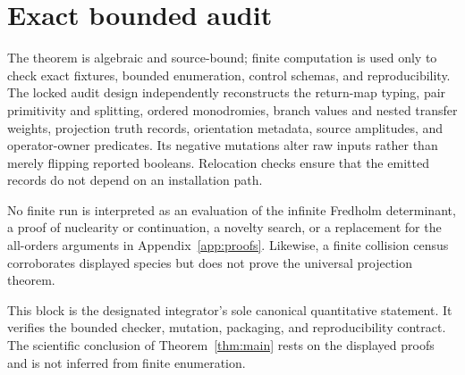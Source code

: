 \section{Exact bounded audit}
\label{sec:audit}

The theorem is algebraic and source-bound; finite computation is used only to
check exact fixtures, bounded enumeration, control schemas, and
reproducibility.  The locked audit design independently reconstructs the
return-map typing, pair primitivity and splitting, ordered monodromies,
branch values and nested transfer weights, projection truth records,
orientation metadata, source amplitudes, and operator-owner predicates.  Its
negative mutations alter raw inputs rather than merely flipping reported
booleans.  Relocation checks ensure that the emitted records do not depend on
an installation path.

No finite run is interpreted as an evaluation of the infinite Fredholm
determinant, a proof of nuclearity or continuation, a novelty search, or a
replacement for the all-orders arguments in Appendix~\ref{app:proofs}.
Likewise, a finite collision census corroborates displayed species but does
not prove the universal projection theorem.

\begin{center}
\end{center}

This block is the designated integrator's sole canonical quantitative
statement.  It verifies the bounded checker, mutation, packaging, and
reproducibility contract.  The scientific conclusion of
Theorem~\ref{thm:main} rests on the displayed proofs and is not inferred from
finite enumeration.
